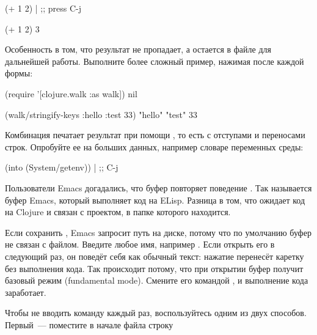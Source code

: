 
\begin{english}
  \begin{clojure}
(+ 1 2) | ;; press C-j

(+ 1 2)
3
  \end{clojure}
\end{english}

Особенность  в том, что результат не пропадает, а остается в файле для дальнейшей работы. Выполните более сложный пример, нажимая  после каждой формы:

\begin{english}
  \begin{clojure}
(require '[clojure.walk :as walk])
nil

(walk/stringify-keys {:hello {:test 33}})
{"hello" {"test" 33}}
  \end{clojure}
\end{english}


Комбинация  печатает результат при помощи , то есть с отступами и переносами строк. Опробуйте ее на больших данных, например словаре переменных среды:

\begin{english}
  \begin{clojure}
(into {} (System/getenv)) | ;; C-j
  \end{clojure}
\end{english}

Пользователи Emacs догадались, что буфер  повторяет поведение . Так называется буфер Emacs, который выполняет код на ELisp. Разница в том, что  ожидает код на Clojure и связан с проектом, в папке которого находится.

Если сохранить , Emacs запросит путь на диске, потому что по умолчанию буфер не связан с файлом. Введите любое имя, например . Если открыть его в следующий раз, он поведёт себя как обычный текст: нажатие  перенесёт каретку без выполнения кода. Так происходит потому, что при открытии буфер получит базовый режим (fundamental mode). Смените его командой , и выполнение кода заработает.

Чтобы не вводить команду каждый раз, воспользуйтесь одним из двух способов. Первый~--- поместите в начале файла строку

